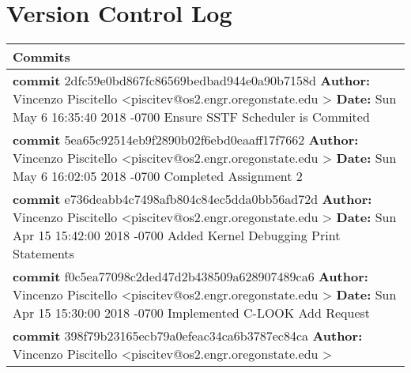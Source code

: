 \documentclass[10pt,draftclsnofoot,onecolumn]{IEEEtran}
\begin{document}
    \section{Version Control Log}
	\begin{center}
        \begin{tabular}{ | p{14cm} | }
        \hline
        {\bf Commits }\\ \hline
        {\bf commit} 2dfc59e0bd867fc86569bedbad944e0a90b7158d\newline
        {\bf Author:} Vincenzo Piscitello \textless piscitev@os2.engr.oregonstate.edu \textgreater \newline
        {\bf Date:}   Sun May 6 16:35:40 2018 -0700\newline
        \newline Ensure SSTF Scheduler is Commited  \\ \hline
        {\bf commit} 5ea65c92514eb9f2890b02f6ebd0eaaff17f7662\newline
        {\bf Author:} Vincenzo Piscitello \textless piscitev@os2.engr.oregonstate.edu \textgreater \newline
        {\bf Date:}   Sun May 6 16:02:05 2018 -0700\newline
        \newline Completed Assignment 2  \\ \hline
        {\bf commit} e736deabb4c7498afb804c84ec5dda0bb56ad72d\newline
        {\bf Author:} Vincenzo Piscitello \textless piscitev@os2.engr.oregonstate.edu \textgreater \newline
        {\bf Date:}   Sun Apr 15 15:42:00 2018 -0700\newline
        \newline Added Kernel Debugging Print Statements  \\ \hline
        {\bf commit} f0c5ea77098c2ded47d2b438509a628907489ca6\newline
        {\bf Author:} Vincenzo Piscitello \textless piscitev@os2.engr.oregonstate.edu \textgreater \newline
        {\bf Date:}   Sun Apr 15 15:30:00 2018 -0700\newline
        \newline Implemented C-LOOK Add Request  \\ \hline
        {\bf commit} 398f79b23165ecb79a0efeac34ca6b3787ec84ca\newline
        {\bf Author:} Vincenzo Piscitello \textless piscitev@os2.engr.oregonstate.edu \textgreater \newline

\end{tabular}
\end{center}
\end{document}
